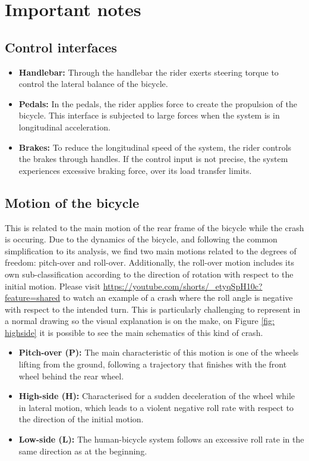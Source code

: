 \documentclass{article}
\begin{document}
\section{Important notes}

\subsection{Control interfaces}

\begin{itemize}
    \item \textbf{Handlebar:} Through the handlebar the rider exerts steering torque to control the lateral balance of the bicycle.
    \item \textbf{Pedals:} In the pedals, the rider applies force to create the propulsion of the bicycle.
        This interface is subjected to large forces when the system is in longitudinal acceleration.
    \item \textbf{Brakes:} To reduce the longitudinal speed of the system, the rider controls the brakes through handles.
        If the control input is not precise, the system experiences excessive braking force, over its load transfer limits.
\end{itemize}


\subsection{Motion of the bicycle}

This is related to the main motion of the rear frame of the bicycle while the crash is occuring.
%
Due to the dynamics of the bicycle, and following the common simplification to its analysis, we find two main motions related to the degrees of freedom: pitch-over and roll-over.
%
Additionally, the roll-over motion includes its own sub-classification according to the direction of rotation with respect to the initial motion.
% 
Please visit \url{https://youtube.com/shorts/_etyqSpH10c?feature=shared} to watch an example of a crash where the roll angle is negative with respect to the intended turn.
%
This is particularly challenging to represent in a normal drawing so the visual explanation is on the make, on Figure \ref{fig: highside} it is possible to see the main schematics of this kind of crash.

\begin{itemize}
    \item \textbf{Pitch-over (P):} The main characteristic of this motion is one of the wheels lifting from the ground, following a trajectory that finishes with the front wheel behind the rear wheel.
    \item \textbf{High-side (H):} Characterised for a sudden deceleration of the wheel while in lateral motion, which leads to a violent negative roll rate with respect to the direction of the initial motion.
    \item \textbf{Low-side (L):} The human-bicycle system follows an excessive roll rate in the same direction as at the beginning.
\end{itemize}
\end{document}
